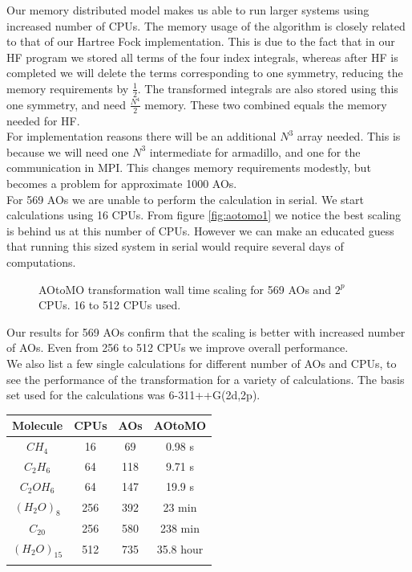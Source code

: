 \documentclass[a4paper,norsk,11pt,twoside]{report}
\begin{document}
Our memory distributed model makes us able to run larger systems using increased number of CPUs. The memory usage of the algorithm is closely related to that of our Hartree Fock implementation. This is due to the fact that in our HF program we stored all terms of the four index integrals, whereas after HF is completed we will delete the terms corresponding to one symmetry, reducing the memory requirements by $\frac{1}{2}$. The transformed integrals are also stored using this one symmetry, and need $\frac{N^4}{2}$ memory. These two combined equals the memory needed for HF. \\

For implementation reasons there will be an additional $N^3$ array needed. This is because we will need one $N^3$ intermediate for armadillo, and one for the communication in MPI. This changes memory requirements  modestly, but becomes a problem for approximate 1000 AOs. \\

For 569 AOs we are unable to perform the calculation in serial. We start calculations using 16 CPUs. From figure \ref{fig:aotomo1} we notice the best scaling is behind us at this number of CPUs. However we can make an educated guess that running this sized system in serial would require several days of computations. \\

\begin{figure}[h!]
\begin{center}
\caption{AOtoMO transformation wall time scaling for 569 AOs and $2^p$ CPUs. 16 to 512 CPUs used. }
\label{fig:aotomo2}
\end{center}
\end{figure}

Our results for 569 AOs confirm that the scaling is better with increased number of AOs. Even from 256 to 512 CPUs we improve overall performance.  \\ 

We also list a few single calculations for different number of AOs and CPUs, to see the performance of the transformation for a variety of calculations. The basis set used for the calculations was 6-311++G(2d,2p). \\

  \begin{center}
  \begin{tabular}{ c c c c }
  \hline
     Molecule & CPUs & AOs & AOtoMO \\ \hline
     $CH_4$ & 16 & 69 & 0.98 s \\
     $C_2H_6$ & 64 & 118 & 9.71 s \\
     $C_2 O H_6$ & 64 & 147 & 19.9 s \\
     $\left(H_2O\right)_8$ & 256 & 392 & 23 min \\
     $C_{20}$ & 256 & 580 & 238 min \\
     $\left(H_2O\right)_{15}$ & 512 & 735 & 35.8 hour \\
     \hline \\
  \end{tabular} 
\end{center} 
\end{document}
